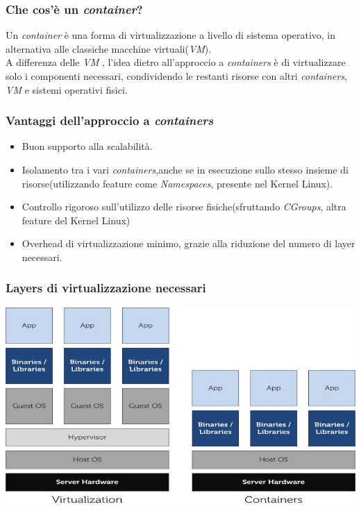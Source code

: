 \documentclass{beamer}
\begin{document}
\begin{frame}
\frametitle{Che cos'è un \textit{container}?}
Un \textit{container} è una forma di virtualizzazione a livello di sistema operativo, in alternativa alle classiche macchine virtuali(\textit{VM}).\\
A differenza delle \textit{VM} , l'idea dietro all'approccio a \textit{containers} è di virtualizzare solo i componenti necessari, condividendo le restanti risorse con altri \textit{containers}, \textit{VM} e sistemi operativi fisici.
\end{frame}


\begin{frame}
\frametitle{Vantaggi dell'approccio a  \textit{containers}}
\begin{itemize}
\item Buon supporto alla scalabilità.
\item Isolamento tra i vari  \textit{containers},anche se in esecuzione sullo stesso insieme di risorse(utilizzando feature come  \textit{Namespaces}, presente nel Kernel Linux).
\item Controllo rigoroso sull'utilizzo delle risorse fisiche(sfruttando \textit{CGroups}, altra feature del Kernel Linux)
\item Overhead di virtualizzazione minimo, grazie alla riduzione del numero di layer necessari.
\end{itemize}
\end{frame}

\begin{frame}
\frametitle{Layers di virtualizzazione necessari}
\includegraphics[width=\textwidth]{pic1}
\end{frame}
\end{document}
